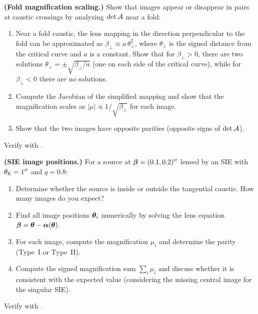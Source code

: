 \begin{exercise}
\label{ex:fold_magnification}
\textbf{(Fold magnification scaling.)}
Show that images appear or disappear in pairs at caustic crossings
by analyzing $\det\mathcal{A}$ near a fold:
\begin{enumerate}[label=(\alph*)]
    \item Near a fold caustic, the lens mapping in the direction
          perpendicular to the fold can be approximated as
          $\beta_\perp \approx a\,\theta_\perp^2$, where
          $\theta_\perp$ is the signed distance from the critical
          curve and $a$ is a constant.  Show that for
          $\beta_\perp > 0$, there are two solutions
          $\theta_\perp = \pm\sqrt{\beta_\perp/a}$ (one on each
          side of the critical curve), while for $\beta_\perp < 0$
          there are no solutions.
    \item Compute the Jacobian of the simplified mapping and show
          that the magnification scales as
          $|\mu| \propto 1/\sqrt{\beta_\perp}$ for each image.
    \item Show that the two images have opposite parities
          (opposite signs of $\det\mathcal{A}$).
\end{enumerate}
Verify with
.
\end{exercise}

\begin{exercise}
\label{ex:sie_images}
\textbf{(SIE image positions.)}
For a source at $\boldsymbol{\beta} = (0.1, 0.2)''$ lensed by an SIE with
$\theta_{\mathrm{E}} = 1''$ and $q = 0.8$:
\begin{enumerate}[label=(\alph*)]
    \item Determine whether the source is inside or outside the
          tangential caustic.  How many images do you expect?
    \item Find all image positions $\boldsymbol{\theta}_i$ numerically by
          solving the lens equation
          $\boldsymbol{\beta} = \boldsymbol{\theta} - \boldsymbol{\alpha}(\boldsymbol{\theta})$.
    \item For each image, compute the magnification $\mu_i$ and
          determine the parity (Type~I or Type~II).
    \item Compute the signed magnification sum $\sum_i \mu_i$ and
          discuss whether it is consistent with the expected value
          (considering the missing central image for the singular SIE).
\end{enumerate}
Verify with
.
\end{exercise}

